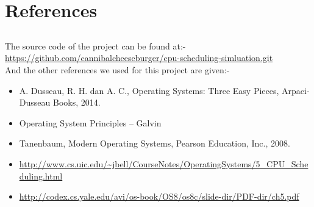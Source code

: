 \documentclass[11pt,a4paper]{report}
\begin{document}
		\section*{References}
		\vskip 1cm
		{\subsection*{}
		{\large{The source code of the project can be found at:-}\\
		  \url{https://github.com/cannibalcheeseburger/cpu-scheduling-simluation.git}\\
	\large{	And the other references we used for this project are given:-}
	\begin{itemize}
	    \item 	A. Dusseau, R. H. dan A. C., Operating Systems: Three Easy Pieces, Arpaci-Dusseau Books, 2014.
	    \item Operating System Principles – Galvin
	    \item Tanenbaum, Modern Operating Systems, Pearson Education, Inc., 2008.
	    \item 	\url{http://www.cs.uic.edu/~jbell/CourseNotes/OperatingSystems/5_CPU_Scheduling.html}
	    \item \url{http://codex.cs.yale.edu/avi/os-book/OS8/os8c/slide-dir/PDF-dir/ch5.pdf}
	\end{itemize}
	}
	}
		
		
\end{document}
